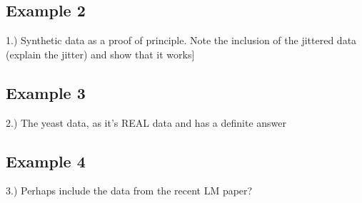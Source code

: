 \documentclass{article}
\begin{document}
\subsection{Example 2}
1.) Synthetic data as a proof of principle.  Note the inclusion of the jittered data (explain the jitter) and show that it works]
\subsection{Example 3}
2.) The yeast data, as it's REAL data and has a definite answer
\subsection{Example 4}
3.) Perhaps include the data from the recent LM paper?
\end{document}
